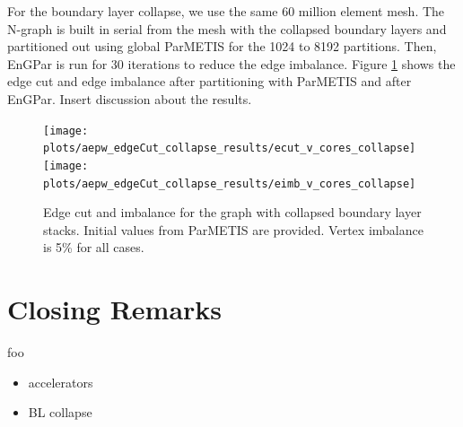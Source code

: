 \documentclass[conference]{IEEEtran}
\begin{document}
For the boundary layer collapse, we use the same 60 million element mesh. The N-graph is
built in serial from the mesh with the collapsed boundary layers and partitioned
out using global ParMETIS for the 1024 to 8192 partitions.
Then, EnGPar is run for 30 iterations to reduce the edge imbalance. Figure \ref{fig:collapse}
shows the edge cut and edge imbalance after partitioning with
ParMETIS and after EnGPar. {\color{red} Insert discussion about the results.} 


\begin{figure}[!ht]
  \centering
  \texttt{[image: plots/aepw\_edgeCut\_collapse\_results/ecut\_v\_cores\_collapse]}
  \texttt{[image: plots/aepw\_edgeCut\_collapse\_results/eimb\_v\_cores\_collapse]}
  \caption{Edge cut and imbalance for the graph with collapsed boundary layer stacks. Initial values from ParMETIS are provided. Vertex imbalance is 5\% for all cases.}
  \label{fig:collapse}
\end{figure}

\section{Closing Remarks}
foo

\begin{itemize}
\item accelerators
\item BL collapse
\end{itemize}



\end{document}
